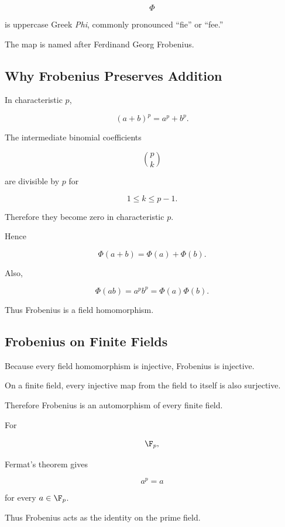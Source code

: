\[ \Phi \]

is uppercase Greek \emph{Phi}, commonly pronounced ``fie'' or ``fee.''

The map is named after Ferdinand Georg Frobenius.

\subsection{Why Frobenius Preserves Addition}
\label{subsec:frobenius-addition}

In characteristic \(p\),

\[ (a+b)^p=a^p+b^p. \]

The intermediate binomial coefficients

\[ \binom{p}{k} \]

are divisible by \(p\) for

\[ 1\leq k\leq p-1. \]

Therefore they become zero in characteristic \(p\).

Hence

\[ \Phi(a+b)=\Phi(a)+\Phi(b). \]

Also,

\[ \Phi(ab)=a^pb^p=\Phi(a)\Phi(b). \]

Thus Frobenius is a field homomorphism.

\subsection{Frobenius on Finite Fields}
\label{subsec:frobenius-finite-fields}

Because every field homomorphism is injective, Frobenius is injective.

On a finite field, every injective map from the field to itself is also
surjective.

Therefore Frobenius is an automorphism of every finite field.

For

\[ \F_p, \]

Fermat's theorem gives

\[ a^p=a \]

for every \(a\in\F_p\).

Thus Frobenius acts as the identity on the prime field.

